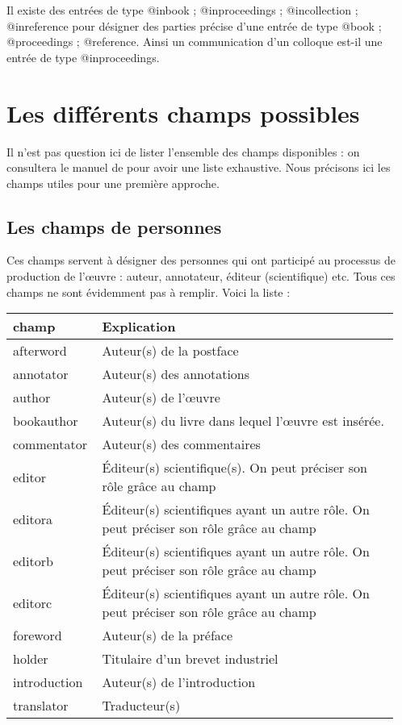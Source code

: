 Il existe des entrées de type @inbook ; @inproceedings ; @incollection ; @inreference pour désigner des parties précise d'une entrée de type @book ; @proceedings ; @reference. Ainsi un communication d'un colloque est-il une entrée de type @inproceedings.

\section{Les différents champs possibles}

Il n'est pas question ici de lister l'ensemble des champs disponibles : on consultera le manuel de  pour avoir une liste exhaustive. Nous précisons ici les champs utiles pour une première approche.

\subsection{Les champs de personnes}

Ces champs servent à désigner des personnes qui ont participé au processus de production de l'œuvre : auteur, annotateur, éditeur (scientifique) etc. Tous ces champs ne sont évidemment pas à remplir. Voici la liste  :


\begin{longtable}{p{0.2\linewidth}p{0.75\linewidth}}
	champ 		& Explication \\
	\endhead
	afterword		& Auteur(s) de la postface \\
	annotator		& Auteur(s) des annotations \\
	author		& Auteur(s) de l'œuvre    \\
	bookauthor		& Auteur(s) du livre dans lequel l'œuvre est insérée. \\
	commentator	& Auteur(s) des commentaires \\
	editor			& Éditeur(s) scientifique(s). On peut préciser son rôle grâce au champ \champ{editortype}	\\
	editora		& Éditeur(s) scientifiques ayant un autre rôle. On peut préciser son rôle grâce au champ \champ{editoratype}  \\
	editorb		& Éditeur(s) scientifiques ayant un autre rôle. On peut préciser son rôle grâce au champ \champ{editorbtype}  \\
	editorc		& Éditeur(s) scientifiques ayant un autre rôle. On peut préciser son rôle grâce au champ \champ{editorctype}  \\
	foreword		& Auteur(s) de la préface\\
	holder			& Titulaire d'un brevet industriel \\
	introduction		& Auteur(s) de l'introduction \\
	translator 		& Traducteur(s) 		\\
\end{longtable}

